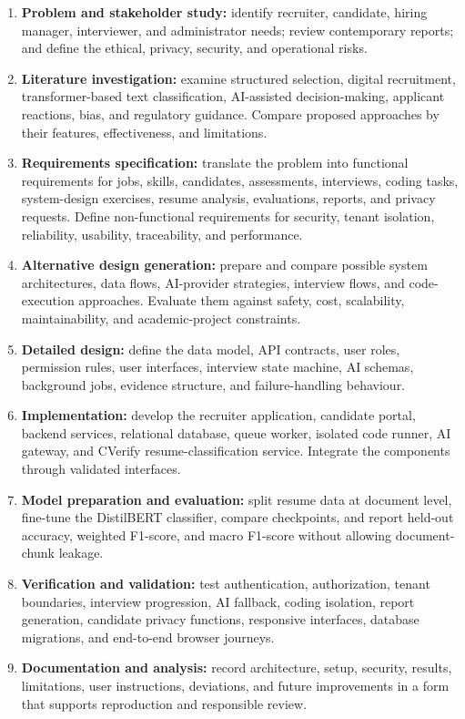 \documentclass[12pt,a4paper,oneside]{report}
\begin{document}
\begin{enumerate}[leftmargin=0.35in,itemsep=4pt]
\item \textbf{Problem and stakeholder study:} identify recruiter, candidate, hiring
manager, interviewer, and administrator needs; review contemporary reports; and define
the ethical, privacy, security, and operational risks.

\item \textbf{Literature investigation:} examine structured selection, digital
recruitment, transformer-based text classification, AI-assisted decision-making,
applicant reactions, bias, and regulatory guidance. Compare proposed approaches by
their features, effectiveness, and limitations.

\item \textbf{Requirements specification:} translate the problem into functional
requirements for jobs, skills, candidates, assessments, interviews, coding tasks,
system-design exercises, resume analysis, evaluations, reports, and privacy requests.
Define non-functional requirements for security, tenant isolation, reliability,
usability, traceability, and performance.

\item \textbf{Alternative design generation:} prepare and compare possible system
architectures, data flows, AI-provider strategies, interview flows, and code-execution
approaches. Evaluate them against safety, cost, scalability, maintainability, and
academic-project constraints.

\item \textbf{Detailed design:} define the data model, API contracts, user roles,
permission rules, user interfaces, interview state machine, AI schemas, background
jobs, evidence structure, and failure-handling behaviour.

\item \textbf{Implementation:} develop the recruiter application, candidate portal,
backend services, relational database, queue worker, isolated code runner, AI gateway,
and CVerify resume-classification service. Integrate the components through validated
interfaces.

\item \textbf{Model preparation and evaluation:} split resume data at document level,
fine-tune the DistilBERT classifier, compare checkpoints, and report held-out accuracy,
weighted F1-score, and macro F1-score without allowing document-chunk leakage.

\item \textbf{Verification and validation:} test authentication, authorization,
tenant boundaries, interview progression, AI fallback, coding isolation, report
generation, candidate privacy functions, responsive interfaces, database migrations,
and end-to-end browser journeys.

\item \textbf{Documentation and analysis:} record architecture, setup, security,
results, limitations, user instructions, deviations, and future improvements in a
form that supports reproduction and responsible review.
\end{enumerate}
\end{document}
